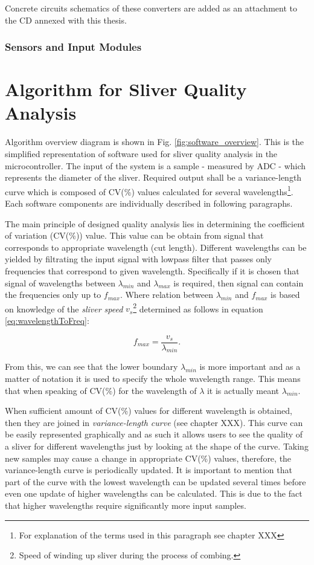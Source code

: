 \documentclass[twoside]{ctuthesis}
\theoremstyle{plain}
\theoremstyle{definition}
\theoremstyle{note}
\begin{document}
Concrete circuits schematics of these converters are added as an attachment to the CD annexed with this thesis.

\subsubsection{Sensors and Input Modules}
\label{sec:Sensors}


\section{Algorithm for Sliver Quality Analysis}
Algorithm overview diagram is shown in Fig. \ref{fig:software_overview}. This is the simplified representation of software used for sliver quality analysis in the microcontroller. The input of the system is a sample - measured by ADC - which represents the diameter of the sliver. Required output shall be a variance-length curve which is composed of CV(\%) values calculated for several wavelengths\footnote{\label{footnote1:textileTerms}For explanation of the terms used in this paragraph see chapter XXX}. Each software components are individually described in following paragraphs.

The main principle of designed quality analysis lies in determining the coefficient of variation (CV(\%)) value. This value can be obtain from signal that corresponds to appropriate wavelength (cut length). Different wavelengths can be yielded by filtrating the input signal with lowpass filter that passes only frequencies that correspond to given wavelength. Specifically if it is chosen that signal of wavelengths between $\lambda_{min}$ and $\lambda_{max}$ is required, then signal can contain the frequencies only up to $f_{max}$. Where relation between $\lambda_{min}$ and $f_{max}$ is based on knowledge of the \textit{sliver speed} $v_{s}$\footnote{Speed of winding up sliver during the process of combing.} determined as follows in equation \ref{eq:wavelengthToFreq}:

\begin{equation} \label{eq:wavelengthToFreq}
f_{max} = \frac{v_{s}}{\lambda_{min}}.
\end{equation}

From this, we can see that the lower boundary $\lambda_{min}$ is more important and as a matter of notation it is used to specify the whole wavelength range. This means that when speaking of CV(\%) for the wavelength of $\lambda$ it is actually meant $\lambda_{min}$.

When sufficient amount of CV(\%) values for different wavelength is obtained, then they are joined in \textit{variance-length curve} (see chapter XXX). This curve can be easily represented graphically and as such it allows users to see the quality of a sliver for different wavelengths just by looking at the shape of the curve. Taking new samples may cause a change in appropriate CV(\%) values, therefore, the variance-length curve is periodically updated. It is important to mention that part of the curve with the lowest wavelength can be updated several times before even one update of higher wavelengths can be calculated. This is due to the fact that higher wavelengths require significantly more input samples.
\end{document}
